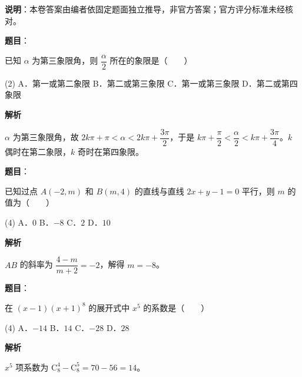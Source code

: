 
\textbf{说明}：本卷答案由编者依固定题面独立推导，非官方答案；官方评分标准未经核对。

\begin{answer}

\textbf{题目}：

已知 $\alpha$ 为第三象限角，则 $\dfrac{\alpha}{2}$ 所在的象限是\mbox{（　　）}

\begin{gkopts}(2)
\task A．第一或第二象限
\task B．第二或第三象限
\task C．第一或第三象限
\task D．第二或第四象限
\end{gkopts}

\textbf{解析}

$\alpha$ 为第三象限角，故 $2k\pi + \pi < \alpha < 2k\pi + \dfrac{3\pi}{2}$，于是 $k\pi + \dfrac{\pi}{2} < \dfrac{\alpha}{2} < k\pi + \dfrac{3\pi}{4}$。$k$ 偶时在第二象限，$k$ 奇时在第四象限。


\end{answer}
\begin{answer}

\textbf{题目}：

已知过点 $A(-2, m)$ 和 $B(m, 4)$ 的直线与直线 $2x + y - 1 = 0$ 平行，则 $m$ 的值为\mbox{（　　）}

\begin{gkopts}(4)
\task A．$0$
\task B．$-8$
\task C．$2$
\task D．$10$
\end{gkopts}

\textbf{解析}

$AB$ 的斜率为 $\dfrac{4 - m}{m + 2} = -2$，解得 $m = -8$。


\end{answer}
\begin{answer}

\textbf{题目}：

在 $(x - 1)(x + 1)^8$ 的展开式中 $x^5$ 的系数是\mbox{（　　）}

\begin{gkopts}(4)
\task A．$-14$
\task B．$14$
\task C．$-28$
\task D．$28$
\end{gkopts}

\textbf{解析}

$x^5$ 项系数为 $\mathrm{C}_8^4 - \mathrm{C}_8^5 = 70 - 56 = 14$。


\end{answer}

